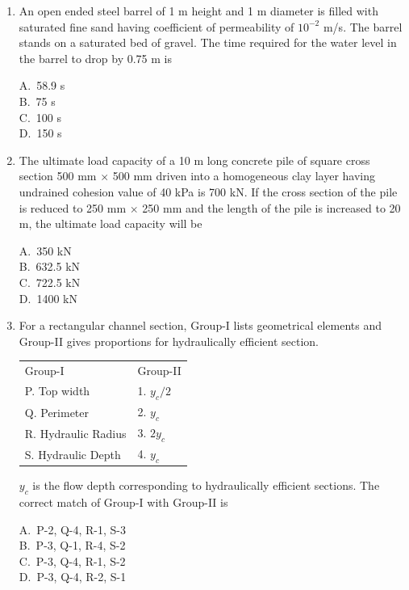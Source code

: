 \documentclass[journal,12pt,onecolumn]{IEEEtran}
\theoremstyle{remark}
\begin{document}
\begin{enumerate}
\noindent\item An open ended steel barrel of 1 m height and 1 m diameter is filled with saturated fine sand having coefficient of permeability of $10^{-2}$ m/s. The barrel stands on a saturated bed of gravel. The time required for the water level in the barrel to drop by 0.75 m is \hfill{}
\begin{multicols}{4}
A.\ 58.9 s \\
B.\ 75 s \\
C.\ 100 s \\
D.\ 150 s
\end{multicols}

\noindent\item The ultimate load capacity of a 10 m long concrete pile of square cross section 500 mm $\times$ 500 mm driven into a homogeneous clay layer having undrained cohesion value of 40 kPa is 700 kN. If the cross section of the pile is reduced to 250 mm $\times$ 250 mm and the length of the pile is increased to 20 m, the ultimate load capacity will be
\hfill{}
\begin{multicols}{4}
A.\ 350 kN \\
B.\ 632.5 kN \\
C.\ 722.5 kN \\
D.\ 1400 kN
\end{multicols}

\setlength{\parindent}{0pt}
\setlength{\parskip}{0.5cm}


\noindent\item For a rectangular channel section, {Group-I} lists geometrical elements and {Group-II} gives proportions for hydraulically efficient section. 

\begin{table}[H]
\centering
\begin{tabular}{l l}
Group-I & Group-II  \\
P. Top width     & 1. $y_c/2$ \\
Q. Perimeter    & 2.  $y_c$     \\
R. Hydraulic Radius    & 3.  $2y_c$          \\
S. Hydraulic Depth    & 4. $y_c$
\end{tabular}
\label{table3}
\end{table}
$y_c$ is the flow depth corresponding to hydraulically efficient sections. The correct match of {Group-I} with {Group-II} is
\hfill{}
\begin{multicols}{4}
A.\ P-2, Q-4, R-1, S-3 \\
B.\ P-3, Q-1, R-4, S-2 \\
C.\ P-3, Q-4, R-1, S-2 \\
D.\ P-3, Q-4, R-2, S-1
\end{multicols}


\end{enumerate}
\end{document}

